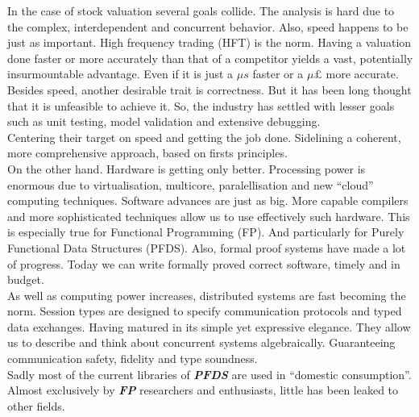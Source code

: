 \documentclass{tufte-book} %
\newcommand{\doccls}[1]{\texttt{#1}}
\newcommand{\pfds}{\textbf{\textit{PFDS}}\xspace}
\newcommand{\fp}{\textbf{\textit{FP}}\xspace}
\begin{document}
In the case of stock valuation several goals collide. The analysis is hard due to the complex, interdependent and  concurrent behavior.  Also, speed happens to be just as important. High frequency trading (HFT) is the norm. Having a valuation done faster or more accurately than that of a competitor yields a vast, potentially insurmountable advantage. Even if it is just a $\mu s$ faster or a $\mu \pounds$ more accurate.\\

Besides speed, another desirable trait is correctness. But it has been long thought that it is unfeasible to achieve it. So, the industry has settled with lesser goals such as unit testing, model validation and extensive debugging.\\

Centering their target on speed and getting the job done. Sidelining a coherent, more comprehensive approach, based on firsts principles.\\

On the other hand. Hardware is getting only better.  Processing power is enormous due to virtualisation, multicore, paralellisation and new ``cloud'' computing techniques. Software advances are just as big. More capable compilers and more sophisticated techniques allow us to use effectively such hardware. This is especially true for Functional Programming (FP). And particularly for Purely Functional Data Structures (PFDS).  Also, formal proof systems have made a lot of progress.  Today we can write formally proved correct software, timely and in budget.\\

As well as computing power increases, distributed systems are fast becoming the norm. Session types are designed to specify communication protocols and typed data exchanges. Having matured in its simple yet expressive elegance. They allow us to describe and think about concurrent systems algebraically. Guaranteeing communication safety, fidelity and type soundness.\\

Sadly most of the current libraries of \pfds are used in ``domestic consumption''. Almost exclusively by \fp researchers and enthusiasts, little has been leaked to  other fields.\\

\end{document}

